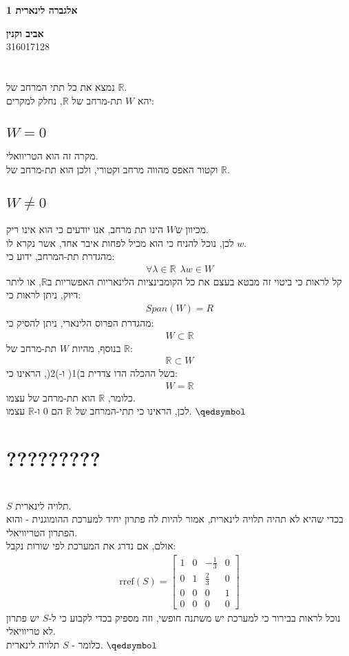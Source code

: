 \documentclass[a4paper, 12pt, leqno]{article}
\newcommand{\sub}[1]{\subsection{\underline{#1}}}
\newcommand{\RR}{\mathbb{R}}
\newcommand{\eq}[1]{\begin{align*}#1\end{align*}}
\newcommand{\eqn}[1]{\begin{align}#1\end{align}}
\renewcommand{\qed}{\hfill\(\qedsymbol\)}
\begin{document}
\begin{titlepage}
    \begin{center}
        \vspace*{4cm}
        {\fontsize{35pt}{35pt}\selectfont \textbf{אלגברה לינארית 1}}
        \vspace{0.4cm}

        {}
        \vfill

        {\Large\textbf{אביב וקנין}\\
        316017128}
    \end{center}
\end{titlepage}

\setcounter{section}{3}
\section{}
נמצא את כל תתי המרחב של $\RR$.\\
יהא $W$ תת-מרחב של $\RR$, נחלק למקרים:
\sub{$W=0$}
מקרה זה הוא הטריוואלי.\\
וקטור האפס מהווה מרחב וקטורי, ולכן הוא תת-מרחב של $\RR$.
\sub{$W\neq0$}
מכיוון ש$W$ הינו תת מרחב, אנו יודעים כי הוא אינו ריק.\\
לכן, נוכל להניח כי הוא מכיל לפחות איבר אחד, אשר נקרא לו $w$.\\
מהגדרת תת-המרחב, ידוע כי:
\eq{
    \forall\lambda\in\RR~~\lambda{w}\in{W}
}
קל לראות כי ביטוי זה מבטא בעצם את כל הקומבינציות הלינאריות האפשריות ב$\RR$, או ליתר דיוק, ניתן לראות כי:
\eq{
    Span(W)=R
}
מהגדרת הפרוס הלינארי, ניתן להסיק כי:
\eqn{
    W\subset\RR
}
בנוסף, מהיות $W$ תת-מרחב של $\RR$:
\eqn{
    \RR\subset{W}
}
בשל ההכלה הדו צדדית ב)1( ו-)2(, הראינו כי:
\eq{
    W=\RR
}
כלומר, $\RR$ הוא תת-מרחב של עצמו.\\
לכן, הראינו כי תתי-המרחב של $\RR$ הם $0$ ו-$\RR$ עצמו.
\qed\pagebreak

\setcounter{section}{6}
\section{?????????}

\pagebreak
\setcounter{section}{13}
\section{}
$S$ תלויה לינארית.\\
בכדי שהיא לא תהיה תלויה לינארית, אמור להיות לה פתרון יחיד למערכת ההומוגנית - והוא הפתרון הטריוויאלי.\\
אולם, אם נדרג את המערכת לפי שורות נקבל:
\eq{
    \text{rref}(S)=\begin{bmatrix}
        1 & 0 & -\frac{1}{3} & 0\\
        0 & 1 & \frac{2}{3} & 0 \\
        0 & 0 & 0 & 1 \\
        0 & 0 & 0 & 0 
    \end{bmatrix}
}
נוכל לראות בבירור כי למערכת יש משתנה חופשי, וזה מספיק בכדי לקבוע כי ל-$S$ יש פתרון לא טריוויאלי.\\
כלומר - $S$ תלויה לינארית.
\qed
\end{document}
